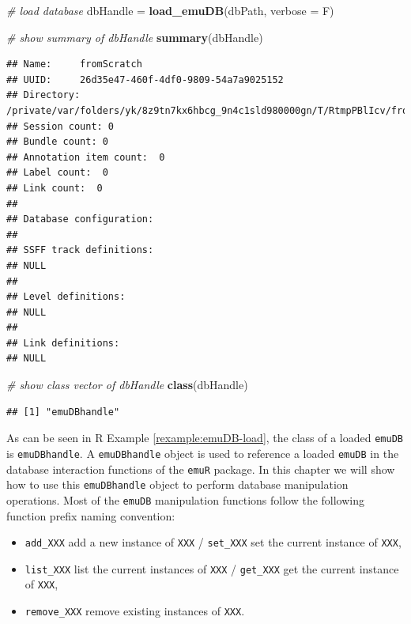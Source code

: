 \documentclass[]{book}
\newenvironment{Shaded}{\begin{snugshade}}{\end{snugshade}}
\newcommand{\CommentTok}[1]{\textcolor[rgb]{0.56,0.35,0.01}{\textit{#1}}}
\newcommand{\DataTypeTok}[1]{\textcolor[rgb]{0.13,0.29,0.53}{#1}}
\newcommand{\KeywordTok}[1]{\textcolor[rgb]{0.13,0.29,0.53}{\textbf{#1}}}
\newcommand{\NormalTok}[1]{#1}
\newcommand{\StringTok}[1]{\textcolor[rgb]{0.31,0.60,0.02}{#1}}
\providecommand{\tightlist}{%
  \setlength{\itemsep}{0pt}\setlength{\parskip}{0pt}}
\theoremstyle{definition}
\theoremstyle{definition}
\theoremstyle{definition}
\theoremstyle{remark}
\begin{document}
\begin{Shaded}
\begin{Highlighting}[]
\CommentTok{# load database}
\NormalTok{dbHandle =}\StringTok{ }\KeywordTok{load_emuDB}\NormalTok{(dbPath, }\DataTypeTok{verbose =}\NormalTok{ F)}

\CommentTok{# show summary of dbHandle}
\KeywordTok{summary}\NormalTok{(dbHandle)}
\end{Highlighting}
\end{Shaded}

\begin{verbatim}
## Name:     fromScratch 
## UUID:     26d35e47-460f-4df0-9809-54a7a9025152 
## Directory:    /private/var/folders/yk/8z9tn7kx6hbcg_9n4c1sld980000gn/T/RtmpPBlIcv/fromScratch_emuDB 
## Session count: 0 
## Bundle count: 0 
## Annotation item count:  0 
## Label count:  0 
## Link count:  0 
## 
## Database configuration:
## 
## SSFF track definitions:
## NULL
## 
## Level definitions:
## NULL
## 
## Link definitions:
## NULL
\end{verbatim}

\begin{Shaded}
\begin{Highlighting}[]
\CommentTok{# show class vector of dbHandle}
\KeywordTok{class}\NormalTok{(dbHandle)}
\end{Highlighting}
\end{Shaded}

\begin{verbatim}
## [1] "emuDBhandle"
\end{verbatim}

As can be seen in R Example \ref{rexample:emuDB-load}, the class of a
loaded \texttt{emuDB} is \texttt{emuDBhandle}. A \texttt{emuDBhandle}
object is used to reference a loaded \texttt{emuDB} in the database
interaction functions of the \texttt{emuR} package. In this chapter we
will show how to use this \texttt{emuDBhandle} object to perform
database manipulation operations. Most of the \texttt{emuDB}
manipulation functions follow the following function prefix naming
convention:

\begin{itemize}
\tightlist
\item
  \texttt{add\_XXX} add a new instance of \texttt{XXX} /
  \texttt{set\_XXX} set the current instance of \texttt{XXX},
\item
  \texttt{list\_XXX} list the current instances of \texttt{XXX} /
  \texttt{get\_XXX} get the current instance of \texttt{XXX},
\item
  \texttt{remove\_XXX} remove existing instances of \texttt{XXX}.
\end{itemize}
\end{document}
